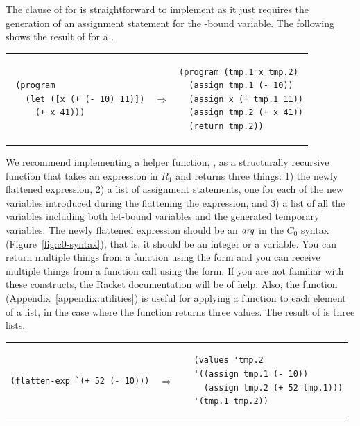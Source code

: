 \documentclass[11pt]{book}
\begin{document}
The clause of  for  is straightforward to
implement as it just requires the generation of an assignment
statement for the -bound variable. The following shows the
result of  for a . \\
\begin{tabular}{lll}
\begin{minipage}{0.4\textwidth}
\begin{lstlisting}
 (program
   (let ([x (+ (- 10) 11)])
     (+ x 41)))
\end{lstlisting}
\end{minipage}
&
$\Rightarrow$
&
\begin{minipage}{0.4\textwidth}
\begin{lstlisting}
(program (tmp.1 x tmp.2)
  (assign tmp.1 (- 10))
  (assign x (+ tmp.1 11))
  (assign tmp.2 (+ x 41))
  (return tmp.2))
\end{lstlisting}
\end{minipage}
\end{tabular}

We recommend implementing a helper function,
, as a structurally recursive
function that takes an expression in $R_1$ and
returns three things: 1) the newly flattened expression,
2) a list of assignment statements, one for each of the new variables
introduced during the flattening the expression, and 3) a list of all
the variables including both let-bound variables and the generated
temporary variables.  The newly flattened expression should be an
$\mathit{arg}$ in the $C_0$ syntax (Figure~\ref{fig:c0-syntax}), that is, it
should be an integer or a variable. You can return multiple things
from a function using the  form and you can receive
multiple things from a function call using the 
form. If you are not familiar with these constructs, the Racket
documentation will be of help.
Also, the  function
(Appendix~\ref{appendix:utilities}) is useful for applying a function
to each element of a list, in the case where the function returns
three values. The result of  is three lists.

\begin{tabular}{lll}
\begin{minipage}{0.4\textwidth}
\begin{lstlisting}
(flatten-exp `(+ 52 (- 10)))
\end{lstlisting}
\end{minipage}
&
$\Rightarrow$
&
\begin{minipage}{0.4\textwidth}
\begin{lstlisting}
  (values 'tmp.2
  '((assign tmp.1 (- 10))
    (assign tmp.2 (+ 52 tmp.1)))
  '(tmp.1 tmp.2))
\end{lstlisting}
\end{minipage}
\end{tabular}
\end{document}
